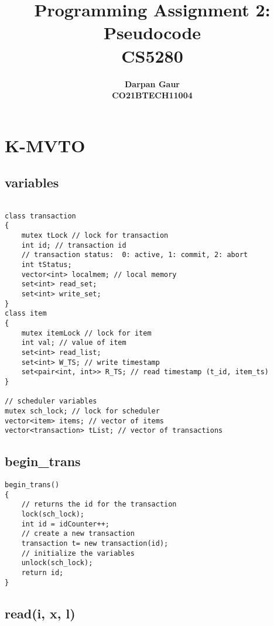 \documentclass[12pt]{article}
\title{
    \textbf{Programming Assignment 2: Pseudocode} \\ 
    \textbf{CS5280} \\
}
\author{
    \textbf{Darpan Gaur} \\
    \textbf{CO21BTECH11004}
}
\date{}
\begin{document}
\maketitle

\hrulefill

\section*{K-MVTO}

\subsection*{variables}
\begin{lstlisting}

class transaction
{
    mutex tLock // lock for transaction
    int id; // transaction id
    // transaction status:  0: active, 1: commit, 2: abort
    int tStatus; 
    vector<int> localmem; // local memory
    set<int> read_set;
    set<int> write_set;
}
class item
{
    mutex itemLock // lock for item
    int val; // value of item
    set<int> read_list;
    set<int> W_TS; // write timestamp
    set<pair<int, int>> R_TS; // read timestamp (t_id, item_ts)
}

// scheduler variables
mutex sch_lock; // lock for scheduler
vector<item> items; // vector of items
vector<transaction> tList; // vector of transactions

\end{lstlisting}

\subsection*{begin\_trans}

\begin{lstlisting}
begin_trans()
{
    // returns the id for the transaction
    lock(sch_lock);
    int id = idCounter++;
    // create a new transaction
    transaction t= new transaction(id);
    // initialize the variables
    unlock(sch_lock);
    return id;
}
\end{lstlisting}

\subsection*{read(i, x, l)}
\end{document}
